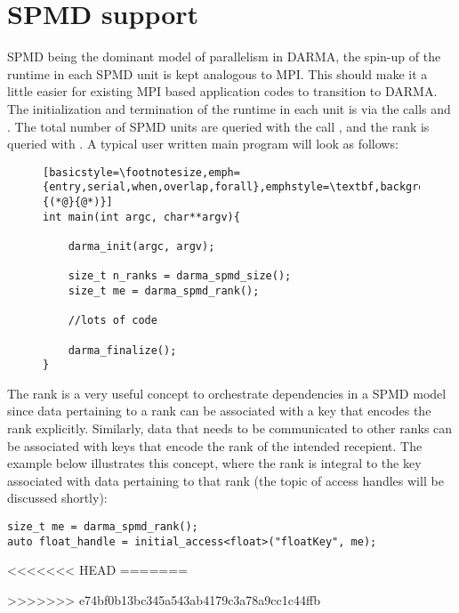 \section{SPMD support}
\label{sec:spmd}
SPMD being the dominant model of parallelism in DARMA, the spin-up of the runtime in each SPMD unit is 
kept analogous to MPI. This should make it a little easier for existing MPI based application codes to transition 
to DARMA. The initialization and termination of the runtime in each unit is via the calls 
and . The total number of SPMD units are queried with the call ,
and the rank is queried with . A typical user written main program will look as follows:
\begin{figure}
\begin{lstlisting}[basicstyle=\footnotesize,emph={entry,serial,when,overlap,forall},emphstyle=\textbf,backgroundcolor=\color{grayish},framexleftmargin=1em,numbers=left,numberstyle=\tiny,numbersep=5pt,escapeinside={(*@}{@*)}]
int main(int argc, char**argv){

	darma_init(argc, argv);

    size_t n_ranks = darma_spmd_size();
    size_t me = darma_spmd_rank();

    //lots of code

    darma_finalize();
}
\end{lstlisting}
\end{figure}

The rank is a very useful concept to orchestrate dependencies in a SPMD model since data pertaining to a rank can be associated
with a key that encodes the rank explicitly. Similarly, data that needs to be communicated to other ranks can be associated with
keys that encode the rank of the intended recepient. The example below illustrates this concept, where the rank is integral to
the key associated with data pertaining to that rank (the topic of access handles will be discussed shortly):
\begin{lstlisting}
size_t me = darma_spmd_rank();
auto float_handle = initial_access<float>("floatKey", me);
\end{lstlisting}  

<<<<<<< HEAD
=======

>>>>>>> e74bf0b13bc345a543ab4179c3a78a9cc1c44ffb



